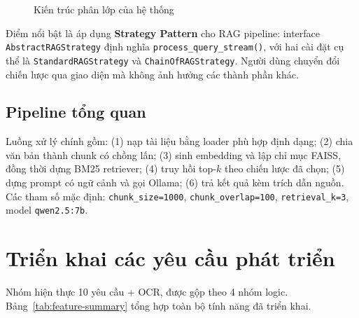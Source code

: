 \documentclass[10pt, conference, a4paper, compsocconf]{IEEEtran}
\begin{document}
\begin{figure}[t]
\centering
{}
\caption{Kiến trúc phân lớp của hệ thống}
\label{fig:architecture}
\end{figure}

Điểm nổi bật là áp dụng \textbf{Strategy Pattern} cho RAG pipeline: interface \texttt{AbstractRAGStrategy} định nghĩa \texttt{process\_query\_stream()}, với hai cài đặt cụ thể là \texttt{StandardRAGStrategy} và \texttt{ChainOfRAGStrategy}. Người dùng chuyển đổi chiến lược qua giao diện mà không ảnh hưởng các thành phần khác.

\subsection{Pipeline tổng quan}

Luồng xử lý chính gồm: (1) nạp tài liệu bằng loader phù hợp định dạng; (2) chia văn bản thành chunk có chồng lấn; (3) sinh embedding và lập chỉ mục FAISS, đồng thời dựng BM25 retriever; (4) truy hồi top-$k$ theo chiến lược đã chọn; (5) dựng prompt có ngữ cảnh và gọi Ollama; (6) trả kết quả kèm trích dẫn nguồn. Các tham số mặc định: \texttt{chunk\_size=1000}, \texttt{chunk\_overlap=100}, \texttt{retrieval\_k=3}, model \texttt{qwen2.5:7b}.

\section{Triển khai các yêu cầu phát triển}

Nhóm hiện thực 10 yêu cầu + OCR, được gộp theo 4 nhóm logic. Bảng~\ref{tab:feature-summary} tổng hợp toàn bộ tính năng đã triển khai.
\end{document}
